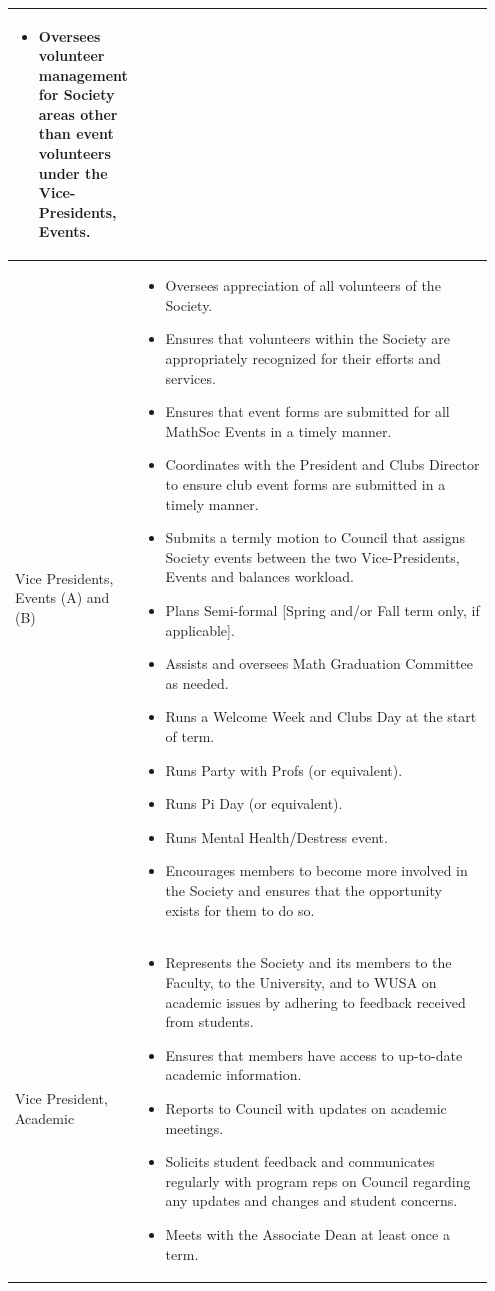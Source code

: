 \begin{longtable}{p{0.2\linewidth} p{0.75\linewidth}}
\begin{itemize}
\item Oversees volunteer management for Society areas other than event volunteers under the Vice-Presidents, Events.
\end{itemize}
\\
\midrule
Vice Presidents, Events (A) and (B) &
\begin{itemize}
\item Oversees appreciation of all volunteers of the Society.
\item Ensures that volunteers within the Society are appropriately recognized for their efforts and services.
\item Ensures that event forms are submitted for all MathSoc Events in a timely manner.
\item Coordinates with the President and Clubs Director to ensure club event forms are submitted in a timely manner.
\item Submits a termly motion to Council that assigns Society events between the two Vice-Presidents, Events and balances workload.
\item Plans Semi-formal [Spring and/or Fall term only, if applicable].
\item Assists and oversees Math Graduation Committee as needed.
\item Runs a Welcome Week and Clubs Day at the start of term.
\item Runs Party with Profs (or equivalent).
\item Runs Pi Day (or equivalent).
\item Runs Mental Health/Destress event.
\item Encourages members to become more involved in the Society and ensures that the opportunity exists for them to do so.
\end{itemize}
\\
\midrule
Vice President, Academic &
\begin{itemize}
\item Represents the Society and its members to the Faculty, to the University, and to WUSA on academic issues by adhering to feedback received from students.
\item Ensures that members have access to up-to-date academic information.
\item Reports to Council with updates on academic meetings.
\item Solicits student feedback and communicates regularly with program reps on Council regarding any updates and changes and student concerns.
\item Meets with the Associate Dean at least once a term.

\end{itemize}
\end{longtable}
